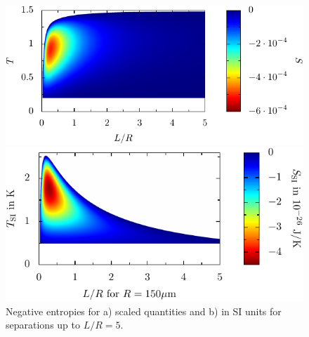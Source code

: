 \begin{figure}
  \begin{minipage}{.5\linewidth}
  \begin{center}
  \includegraphics[scale=0.71]{plots/entropy_density_plot/plot_scaled_wide.pdf}
  \end{center}
  \end{minipage}%
  \begin{minipage}{.5\linewidth}
  \begin{center}
  \includegraphics[scale=0.71]{plots/entropy_density_plot/plot_SI_wide.pdf}
  \end{center}
  \end{minipage}

  \caption{Negative entropies for a) scaled quantities and b) in SI units for separations up to $L/R=5$.}

  \label{fig:neg_entropies}
\end{figure}

